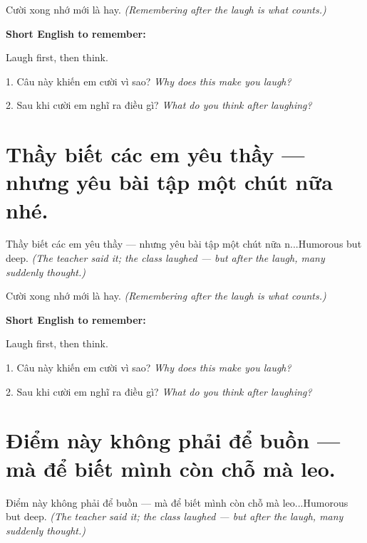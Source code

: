\begin{baihoc}
Cười xong nhớ mới là hay.
\textit{(Remembering after the laugh is what counts.)}
\end{baihoc}

\begin{ghinhoanh}
\textbf{Short English to remember:}

Laugh first, then think.

\end{ghinhoanh}

\begin{tuhocnhanh}
1. Câu này khiến em cười vì sao? \textit{Why does this make you laugh?}

2. Sau khi cười em nghĩ ra điều gì? \textit{What do you think after laughing?}
\end{tuhocnhanh}
\ngancach


\section{Thầy biết các em yêu thầy — nhưng yêu bài tập một chút nữa nhé.}
\begin{truyen}{Thầy biết các em yêu thầy — nhưng yêu bài tập một chút nữa n...}{Humorous but deep.}
\textit{(The teacher said it; the class laughed — but after the laugh, many suddenly thought.)}
\end{truyen}

\begin{baihoc}
Cười xong nhớ mới là hay.
\textit{(Remembering after the laugh is what counts.)}
\end{baihoc}

\begin{ghinhoanh}
\textbf{Short English to remember:}

Laugh first, then think.

\end{ghinhoanh}

\begin{tuhocnhanh}
1. Câu này khiến em cười vì sao? \textit{Why does this make you laugh?}

2. Sau khi cười em nghĩ ra điều gì? \textit{What do you think after laughing?}
\end{tuhocnhanh}
\ngancach


\section{Điểm này không phải để buồn — mà để biết mình còn chỗ mà leo.}
\begin{truyen}{Điểm này không phải để buồn — mà để biết mình còn chỗ mà leo...}{Humorous but deep.}
\textit{(The teacher said it; the class laughed — but after the laugh, many suddenly thought.)}
\end{truyen}

